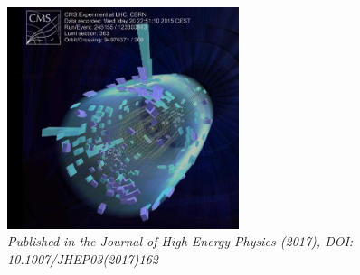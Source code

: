 \begin{figure}[h!] 
    \centering
     \vspace*{10mm}
    \includegraphics[height=6.5cm]{figures/analysis/search1/misc/first_coll.png}
    \vspace*{10mm}
    \caption*{\footnotesize{\textit{Published in the Journal of High Energy Physics (2017), DOI: 10.1007/JHEP03(2017)162}}}
\end{figure}
\clearpage

\clearpage

